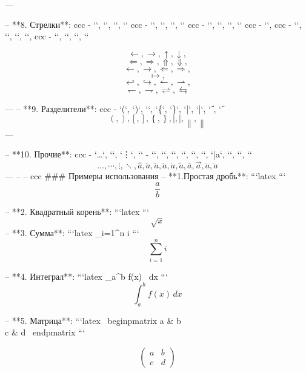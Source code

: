 ---


-- **8. Стрелки**:
ccc -    `\leftarrow`, `\rightarrow`, `\uparrow`, `\downarrow`
ccc -    `\Leftarrow`, `\Rightarrow`, `\Uparrow`, `\Downarrow`
ccc -    `\longleftarrow`, `\longrightarrow`, `\Longleftarrow`, `\Longrightarrow`
ccc -    `\mapsto`,
ccc -    `\hookleftarrow`, `\hookrightarrow`, `\leftharpoonup`, `\rightharpoonup`,
ccc -    `\leftharpoondown`, `\rightharpoondown`, `\rightleftharpoons`, `\leftrightarrows`


\[       \leftarrow ,  \rightarrow ,  \uparrow ,  \downarrow , \]
\[       \Leftarrow ,  \Rightarrow ,  \Uparrow ,  \Downarrow ,\]
\[       \longleftarrow ,  \longrightarrow ,  \Longleftarrow ,  \Longrightarrow , \] 
\[       \mapsto , \]
\[       \hookleftarrow ,  \hookrightarrow ,  \leftharpoonup ,  \rightharpoonup ,\]
\[      \leftharpoondown ,  \rightharpoondown ,  \rightleftharpoons ,  \leftrightarrows \] 


--- 
--  **9. Разделители**:
ccc   - `\left(`, `\right)`, `\left[`, `\right]`, `\left\{`, `\right\}`, `\left|`, `\right|`, `\left\|`, `\right\|`
   \[
   
     \left( ,  \right) ,  \left[ ,  \right] ,  \left\{ ,  \right\} ,  \left| ,  \right| ,  \left\| ,  \right\| 
   \]
--- 

--  **10. Прочие**:
ccc    - `\ldots`, `\cdots`, `\vdots`, `\ddots`
    - ``, ``, ``, ``, ``, ``, `\bar{a}`, ``, ``, ``
\[
     \ldots ,  \cdots ,  \vdots ,  \ddots, 
      \hat{a} ,  \check{a} ,  \breve{a} ,  \acute{a} ,  \grave{a} ,  \tilde{a} ,  \bar{a} ,  \vec{a} ,  \dot{a} ,  \ddot{a} 


\]
---
-- 
-- 
ccc  ### Примеры использования
-- 
 **1.Простая дробь**:
   ```latex
   ```
\[    \frac{a}{b} \]

-- **2. Квадратный корень**:
   ```latex
   ```
\[   \sqrt{x} \]
-- **3. Сумма**:
   ```latex
   \sum_{i=1}^{n} i
   ```
   \[ \sum_{i=1}^{n} i \]

--  **4. Интеграл**:
   ```latex
   \int_{a}^{b} f(x) \, dx
   ```
   \[ \int_{a}^{b} f(x) \, dx \]

--  **5. Матрица**:
   ```latex
   \ begin{pmatrix}
   a & b \\ 
   c & d 
   \ end{pmatrix} 
 ```

\[
\begin{pmatrix}
   a & b \\
   c & d
   \end{pmatrix}


\]

